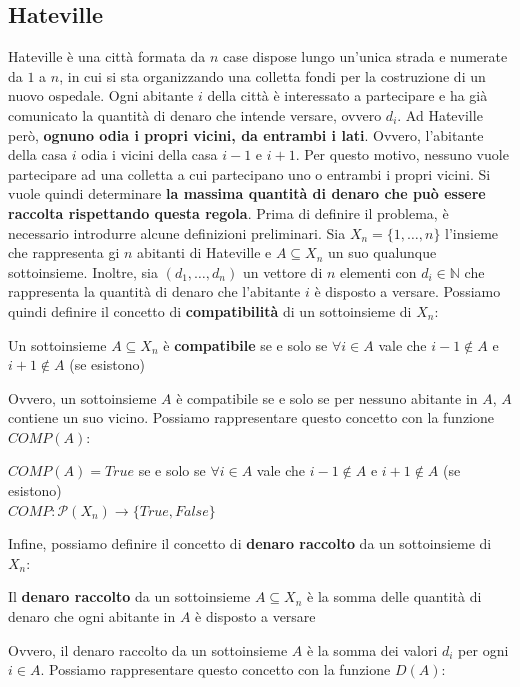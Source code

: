 \documentclass[12pt]{article}
\begin{document}
\subsection{Hateville}
Hateville è una città formata da $n$ case dispose lungo un'unica strada e numerate da $1$ a $n$, in cui si sta organizzando una colletta fondi per la costruzione di un nuovo ospedale.
Ogni abitante $i$ della città è interessato a partecipare e ha già comunicato la quantità di denaro che intende versare, ovvero $d_i$. Ad Hateville però, \textbf{ognuno odia i propri vicini, da entrambi i lati}.
Ovvero, l'abitante della casa $i$ odia i vicini della casa $i-1$ e $i+1$. Per questo motivo, nessuno vuole partecipare ad una colletta a cui partecipano uno o entrambi i propri vicini.
Si vuole quindi determinare \textbf{la massima quantità di denaro che può essere raccolta rispettando questa regola}. \newline
Prima di definire il problema, è necessario introdurre alcune definizioni preliminari.
Sia $X_n = \{1,\dots,n\}$ l'insieme che rappresenta gi $n$ abitanti di Hateville e $A \subseteq X_n$ un suo qualunque sottoinsieme.
Inoltre, sia $(d_1, \dots, d_n)$ un vettore di $n$ elementi con $d_i \in \mathbb{N}$ che rappresenta la quantità di denaro che l'abitante $i$ è disposto a versare.
Possiamo quindi definire il concetto di \textbf{compatibilità} di un sottoinsieme di $X_n$:
\begin{center}
    Un sottoinsieme $A \subseteq X_n$ è \textbf{compatibile} se e solo se $\forall i \in A$ vale che $i-1 \notin A$ e $i+1 \notin A$ (se esistono)
\end{center}
Ovvero, un sottoinsieme $A$ è compatibile se e solo se per nessuno abitante in $A$, $A$ contiene un suo vicino. Possiamo rappresentare questo concetto con la funzione $COMP(A)$:
\begin{center}
    $COMP(A) = True$ se e solo se $\forall i \in A$ vale che $i-1 \notin A$ e $i+1 \notin A$ (se esistono) \\
    $COMP: \mathcal{P}(X_n) \rightarrow \{True, False\}$
\end{center}
Infine, possiamo definire il concetto di \textbf{denaro raccolto} da un sottoinsieme di $X_n$:
\begin{center}
    Il \textbf{denaro raccolto} da un sottoinsieme $A \subseteq X_n$ è la somma delle quantità di denaro che ogni abitante in $A$ è disposto a versare
\end{center}
Ovvero, il denaro raccolto da un sottoinsieme $A$ è la somma dei valori $d_i$ per ogni $i \in A$. Possiamo rappresentare questo concetto con la funzione $D(A)$:
\end{document}

